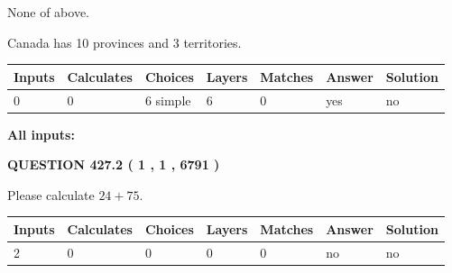 \documentclass[12pt]{article}
\begin{document}
 
 None of above.
 
 
\noindent{}
 
 
Canada has 10  provinces and 3 territories.
 
 
\noindent{}
 
 
   
   
   
   
\noindent\begin{tabular}{|l|l|l|l|l|l|l|}
 \hline
Inputs & Calculates & Choices & Layers & Matches & Answer & Solution \\ \hline
 0  & 
 0  & 
 6
  simple  
  & 
 6  & 
 0  & 
  yes & 
  no 
  \\ \hline
 \end{tabular}
   
   
   
   
\noindent{}
   
   
   
   
\noindent\vspace{0.1in}\hspace{-0.08in} {\textbf{\Large{All inputs: }}}
   
   
  
\vspace{0.2in}
  
{\textbf{\Large{QUESTION
427.2 
 ( 1 , 1 , 6791 )
}}}
  
  
 
Please calculate $ %
24 +  %
75 $.
 
 
   
   
   
   
\noindent\begin{tabular}{|l|l|l|l|l|l|l|}
 \hline
Inputs & Calculates & Choices & Layers & Matches & Answer & Solution \\ \hline
 2  & 
 0  & 
 0
  & 
 0  & 
 0  & 
  no & 
  no 
  \\ \hline
 \end{tabular}
   
   
   
   
\noindent{}
   
\end{document}
